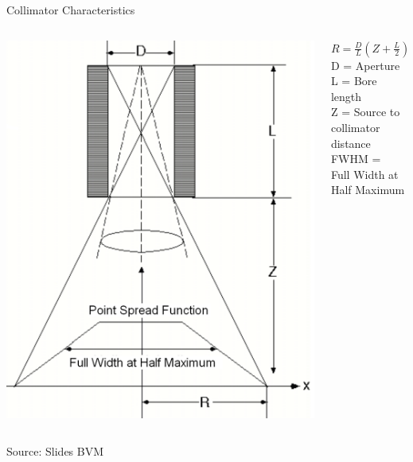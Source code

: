 \begin{frame}{Collimator Characteristics}
    \begin{center}
        \begin{columns}[T, onlytextwidth]
            \begin{column}{0.4\textwidth}
                \includegraphics[height=0.75\textheight]{images/colli_geometry}\\
            \end{column}
            \begin{column}{0.5\textwidth}
                \bigskip\bigskip
                {\LARGE
                    $R = \frac{D}{L}(Z+\frac{L}{2})$\\
                }
                \bigskip\bigskip
                D = Aperture\\
                L = Bore length\\
                Z = Source to collimator distance\\
                FWHM = \\Full Width at Half Maximum\\
            \end{column}
        \end{columns}
        {\scriptsize Source: Slides BVM}
    \end{center}
\end{frame}


